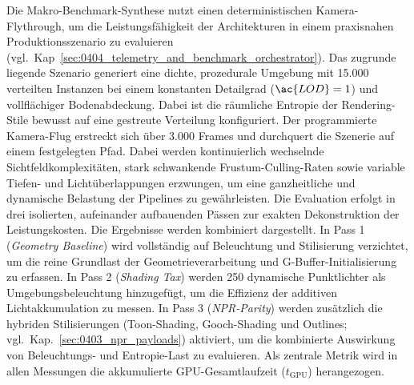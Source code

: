 Die Makro-Benchmark-Synthese nutzt einen deterministischen Kamera-Flythrough, um die Leistungsfähigkeit der
Architekturen in einem praxisnahen Produktionsszenario zu evaluieren
(vgl.\ Kap~\ref{sec:0404_telemetry_and_benchmark_orchestrator}).
Das zugrunde liegende Szenario generiert eine dichte, prozedurale Umgebung mit 15.000 verteilten Instanzen bei einem
konstanten Detailgrad ($\ac{LOD} = 1$) und vollflächiger Bodenabdeckung.
Dabei ist die räumliche Entropie der Rendering-Stile bewusst auf eine gestreute Verteilung konfiguriert.
Der programmierte Kamera-Flug erstreckt sich über $3.000$ Frames und durchquert die Szenerie auf einem festgelegten Pfad.
Dabei werden kontinuierlich wechselnde Sichtfeldkomplexitäten, stark schwankende Frustum-Culling-Raten sowie variable
Tiefen- und Lichtüberlappungen erzwungen, um eine ganzheitliche und dynamische Belastung der Pipelines zu gewährleisten.
Die Evaluation erfolgt in drei isolierten, aufeinander aufbauenden Pässen zur exakten Dekonstruktion der Leistungskosten.
Die Ergebnisse werden kombiniert dargestellt.
In Pass 1 (\textit{Geometry Baseline}) wird vollständig auf Beleuchtung und Stilisierung verzichtet, um die reine
Grundlast der Geometrieverarbeitung und \ac{G-Buffer}-Initialisierung zu erfassen.
In Pass 2 (\textit{Shading Tax}) werden 250 dynamische Punktlichter als Umgebungsbeleuchtung hinzugefügt, um
die Effizienz der additiven Lichtakkumulation zu messen.
In Pass 3 (\textit{\ac{NPR}-Parity}) werden zusätzlich die hybriden Stilisierungen (Toon-Shading, Gooch-Shading und
Outlines; vgl.\ Kap.~\ref{sec:0403_npr_payloads}) aktiviert, um die kombinierte Auswirkung von Beleuchtungs- und
Entropie-Last zu evaluieren.
Als zentrale Metrik wird in allen Messungen die akkumulierte \ac{GPU}-Gesamtlaufzeit ($t_{\text{GPU}}$) herangezogen.


